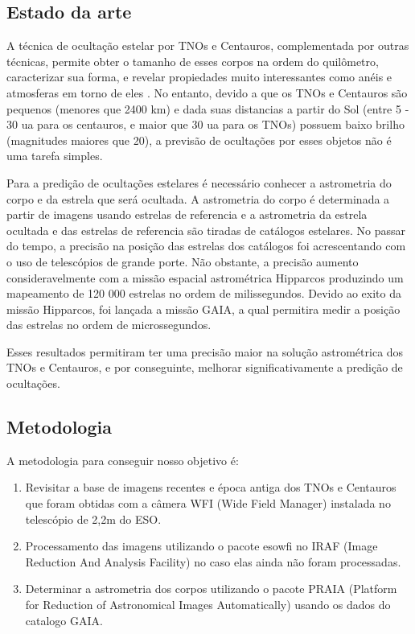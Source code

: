 \documentclass[a4paper, 11pt]{article}
\begin{document}
\subsection{Estado da arte}

A técnica de ocultação estelar por TNOs e Centauros, complementada por outras técnicas, permite obter o tamanho de esses corpos na ordem do quilômetro, caracterizar sua forma, e revelar propiedades muito interessantes como anéis \citep{2017Natur.550..219O, 2014AGUFM.P43F..01B} e atmosferas em torno de eles \citep{1538-3881-136-5-1757, 2006Natur.439...52S}. No entanto, devido a que os TNOs e Centauros são pequenos (menores que 2400 km) e dada suas distancias a partir do Sol (entre  5 - 30 ua para os centauros, e maior que 30 ua para os TNOs) possuem baixo brilho (magnitudes maiores que 20), a previsão de ocultações por esses objetos não é uma tarefa simples. 

Para a predição de ocultações estelares é necessário conhecer a astrometria do corpo e da estrela que será ocultada. A astrometria do corpo é determinada a partir de imagens usando estrelas de referencia e a astrometria da estrela ocultada e das estrelas de referencia são tiradas de catálogos estelares. No passar do tempo, a precisão na posição das estrelas dos catálogos foi acrescentando com o uso de telescópios de grande porte. Não obstante, a precisão aumento consideravelmente com a missão espacial astrométrica Hipparcos produzindo um mapeamento de 120 000 estrelas no ordem de milissegundos. Devido ao exito da missão Hipparcos, foi lançada a missão GAIA, a qual permitira medir a posição das estrelas no ordem de microssegundos.

Esses resultados permitiram ter uma precisão maior na solução astrométrica dos TNOs e Centauros, e por conseguinte, melhorar significativamente a predição de ocultações.     
\subsection{Metodologia}

A metodologia para conseguir nosso objetivo é:

\begin{enumerate}
  \item Revisitar a base de imagens recentes e época antiga dos TNOs e Centauros que foram obtidas com a câmera WFI (Wide Field Manager) instalada no telescópio de 2,2m do ESO.
  \item Processamento das imagens utilizando o pacote esowfi no IRAF (Image Reduction And Analysis Facility) no caso elas ainda não foram processadas.
  \item Determinar a astrometria dos corpos utilizando o pacote PRAIA (Platform for Reduction of Astronomical Images Automatically) usando os dados do catalogo GAIA.
\end{enumerate}
\end{document}
